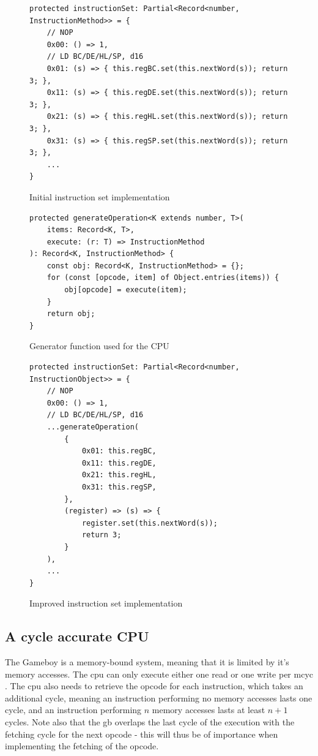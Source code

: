 \documentclass[11pt]{report}
\begin{document}
\begin{figure}[h]
    \begin{verbatim}
protected instructionSet: Partial<Record<number, InstructionMethod>> = {
    // NOP
    0x00: () => 1,
    // LD BC/DE/HL/SP, d16
    0x01: (s) => { this.regBC.set(this.nextWord(s)); return 3; },
    0x11: (s) => { this.regDE.set(this.nextWord(s)); return 3; },
    0x21: (s) => { this.regHL.set(this.nextWord(s)); return 3; },
    0x31: (s) => { this.regSP.set(this.nextWord(s)); return 3; },
    ...
}
    \end{verbatim}
    \caption{Initial instruction set implementation}
    \label{fig:instset-first}
\end{figure}

\begin{figure}[h]
    \begin{verbatim}
protected generateOperation<K extends number, T>(
    items: Record<K, T>,
    execute: (r: T) => InstructionMethod
): Record<K, InstructionMethod> {
    const obj: Record<K, InstructionMethod> = {};
    for (const [opcode, item] of Object.entries(items)) {
        obj[opcode] = execute(item);
    }
    return obj;
}
    \end{verbatim}
    \caption{Generator function used for the CPU}
    \label{fig:cpu-gen-function}
\end{figure}

\begin{figure}[h]
    \begin{verbatim}
protected instructionSet: Partial<Record<number, InstructionObject>> = {
    // NOP
    0x00: () => 1,
    // LD BC/DE/HL/SP, d16
    ...generateOperation(
        {
            0x01: this.regBC,
            0x11: this.regDE,
            0x21: this.regHL,
            0x31: this.regSP,
        }, 
        (register) => (s) => {
            register.set(this.nextWord(s));
            return 3;
        }
    ),
    ...
}
    \end{verbatim}
    \caption{Improved instruction set implementation}
    \label{fig:instset-second}
\end{figure}

\subsection{A cycle accurate CPU}

The Gameboy is a memory-bound system, meaning that it is limited by it's memory accesses. The \gls{cpu} can only execute either one read or one write per \gls{mcyc} \cite[CPU core timing]{gbctr}. The \gls{cpu} also needs to retrieve the opcode for each instruction, which takes an additional cycle, meaning an instruction performing no memory accesses lasts one cycle, and an instruction performing $n$ memory accesses lasts at least $n + 1$ cycles. Note also that the \gls{gb} overlaps the last cycle of the execution with the fetching cycle for the next opcode - this will thus be of importance when implementing the fetching of the opcode.
\end{document}
